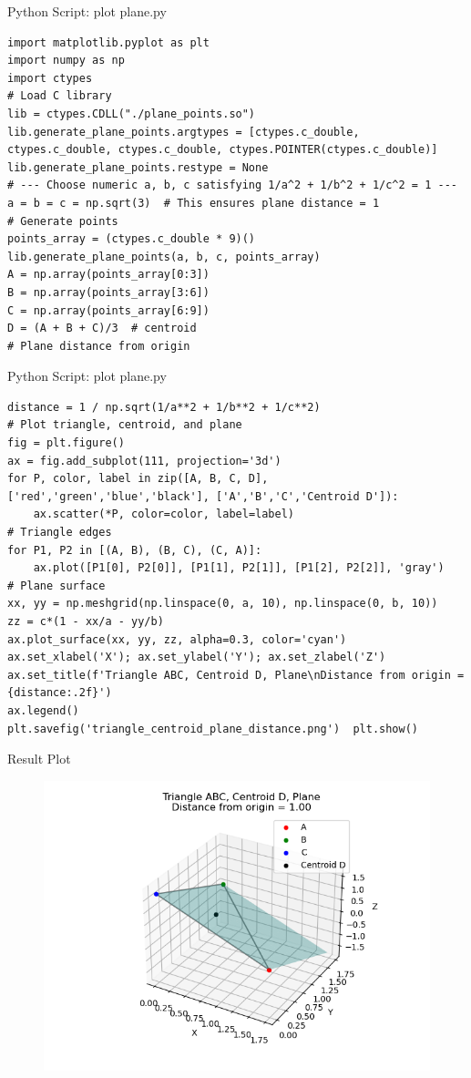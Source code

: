 \documentclass{beamer}
\numberwithin{equation}{section}
\theoremstyle{remark}
\begin{document}

\begin{frame}[fragile]{Python Script: plot plane.py}
\begin{verbatim}
import matplotlib.pyplot as plt
import numpy as np
import ctypes
# Load C library
lib = ctypes.CDLL("./plane_points.so")
lib.generate_plane_points.argtypes = [ctypes.c_double, ctypes.c_double, ctypes.c_double, ctypes.POINTER(ctypes.c_double)]
lib.generate_plane_points.restype = None
# --- Choose numeric a, b, c satisfying 1/a^2 + 1/b^2 + 1/c^2 = 1 ---
a = b = c = np.sqrt(3)  # This ensures plane distance = 1
# Generate points
points_array = (ctypes.c_double * 9)()
lib.generate_plane_points(a, b, c, points_array)
A = np.array(points_array[0:3])
B = np.array(points_array[3:6])
C = np.array(points_array[6:9])
D = (A + B + C)/3  # centroid
# Plane distance from origin
\end{verbatim}
\end{frame}
\begin{frame}[fragile]{Python Script: plot plane.py}
\begin{verbatim}
distance = 1 / np.sqrt(1/a**2 + 1/b**2 + 1/c**2)
# Plot triangle, centroid, and plane
fig = plt.figure()
ax = fig.add_subplot(111, projection='3d')
for P, color, label in zip([A, B, C, D], ['red','green','blue','black'], ['A','B','C','Centroid D']):
    ax.scatter(*P, color=color, label=label)
# Triangle edges
for P1, P2 in [(A, B), (B, C), (C, A)]:
    ax.plot([P1[0], P2[0]], [P1[1], P2[1]], [P1[2], P2[2]], 'gray')
# Plane surface
xx, yy = np.meshgrid(np.linspace(0, a, 10), np.linspace(0, b, 10))
zz = c*(1 - xx/a - yy/b)
ax.plot_surface(xx, yy, zz, alpha=0.3, color='cyan')
ax.set_xlabel('X'); ax.set_ylabel('Y'); ax.set_zlabel('Z')
ax.set_title(f'Triangle ABC, Centroid D, Plane\nDistance from origin = {distance:.2f}')
ax.legend()
plt.savefig('triangle_centroid_plane_distance.png')  plt.show()

\end{verbatim}
\end{frame}

\begin{frame}{Result Plot}
 \begin{figure}[H]
     \centering
     \includegraphics[width=0.8\columnwidth]{figs/fig1.png}
     \caption*{}
     \label{fig:fig1}
 \end{figure}
 
\end{frame}
\end{document}
